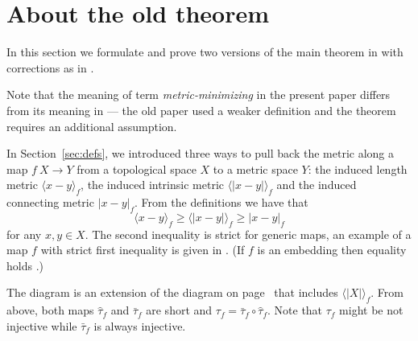 \section{About the old theorem}\label{sec:old-thm}

In this section we formulate and prove two versions of the main theorem in \cite{petrunin-metric-min} with corrections as in \cite{petrunin-metric-min-correction}.

Note that the meaning of term \emph{metric-minimizing} in the present paper differs from its meaning in \cite{petrunin-metric-min} --- the old paper used a weaker definition and the theorem requires an additional assumption.

In Section~\ref{sec:defs}, we introduced three ways to pull back the metric along a map $f\:X\to Y$ from a topological space $X$ to a metric space $Y$: 
the induced length metric
$\langle x-y\rangle_f$,
the induced intrinsic metric $\langle| x-y|\rangle_f$
and the induced connecting metric $|x-y|_f$.
From the definitions we have that 
\[\langle x-y\rangle_f\ge \langle| x-y|\rangle_f\ge |x-y|_f\]
for any $x,y\in X$.
The second inequality is strict for generic maps, 
an example of a map $f$ with strict first inequality is given in \cite[4.2]{petrunin-intrinisic}.
(If $f$ is an embedding then equality holds \cite[4.5]{ledonne}.)
\begin{figure}[h]
\centering
{}
\end{figure}
The diagram is an extension of the diagram on page~\pageref{diagram-page} that includes $\langle|X|\rangle_f$.
From above, both maps $\hat\tau_f$ and $\bar\tau_f$ are short and $\tau_f=\bar\tau_f\circ\hat\tau_f$.
Note that $\tau_f$ might be not injective while $\bar\tau_f$ is always injective.

